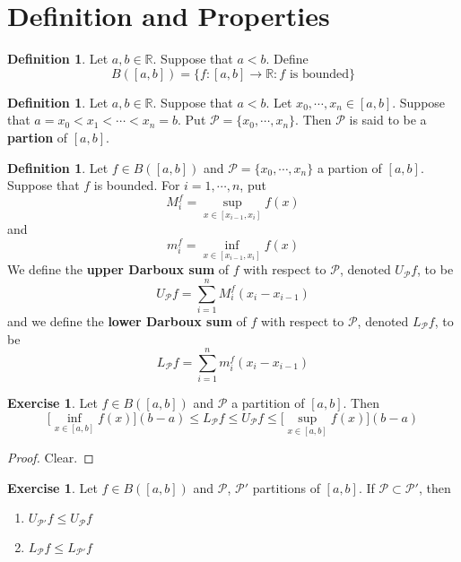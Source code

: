 \documentclass{book}
\theoremstyle{definition}
\newtheorem{defn}[definition]{Definition}
\newtheorem{ex}[definition]{Exercise}
\newcommand{\R}{\mathbb{R}}
\newcommand{\MP}{\mathcal{P}}
\newcommand{\lex}[1]{\label{ex:#1}}
\newcommand{\ld}[1]{\label{defn:#1}}
\DeclareMathOperator*{\0}{\mbf{0}}
\DeclareMathOperator*{\1}{\mbf{1}}
\begin{document}
	\section{Definition and Properties}
	\begin{defn} \ld{00000} 
		Let $a,b \in \R$. Suppose that $a<b$. Define $$B([a,b]) = \{f:[a,b] \rightarrow \R: f\text{ is bounded}\}$$
	\end{defn}
	
	\begin{defn} \ld{00000} 
		Let $a,b \in \R$. Suppose that $a<b$. Let $x_0, \cdots, x_n \in [a,b]$. Suppose that $a= x_0 < x_1 < \cdots < x_n = b$. Put $\MP = \{x_0, \cdots, x_n\}$. Then $\MP$ is said to be a \textbf{partion} of $[a,b]$. 
	\end{defn}
	
	\begin{defn} \ld{00000} 
		Let $f \in B([a,b])$ and $\MP = \{x_0, \cdots, x_n\}$ a partion of $[a,b]$. Suppose that $f$ is bounded. For $i = 1, \cdots, n$, put 
		$$M^f_i = \sup_{x \in [x_{i-1}, x_i]} f(x)$$ and 
		$$m^f_i = \inf_{x \in [x_{i-1}, x_i]} f(x)$$ 
		We define the \textbf{upper Darboux sum} of $f$ with respect to $\MP$, denoted $U_\MP f$, to be $$U_\MP f = \sum_{i=1}^n M^f_i (x_i - x_{i-1})$$ 
		and we define the \textbf{lower Darboux sum} of $f$ with respect to $\MP$, denoted $L_\MP f$, to be
		$$L_\MP f = \sum_{i=1}^n m^f_i (x_i - x_{i-1})$$ 
	\end{defn}

	\begin{ex} \lex{00000} 
		Let $f \in B([a,b])$ and $\MP$ a partition of $[a,b]$. Then $$\bigg[\inf_{x \in [a,b]} f(x) \bigg] (b-a) \leq L_\MP f \leq U_\MP f \leq \bigg[ \sup_{x \in [a,b]} f(x)  \bigg] (b-a)$$
	\end{ex}

	\begin{proof}
		Clear.
	\end{proof}

	\begin{ex} \lex{00000} 
			Let $f \in B([a,b])$ and $\MP$, $\MP'$ partitions of $[a,b]$. If $\MP \subset \MP'$, then 
			\begin{enumerate}
				\item $U_{\MP'} f \leq U_{\MP} f$
				\item $L_{\MP} f \leq L_{\MP'} f$
			\end{enumerate}
	\end{ex}
\end{document}
